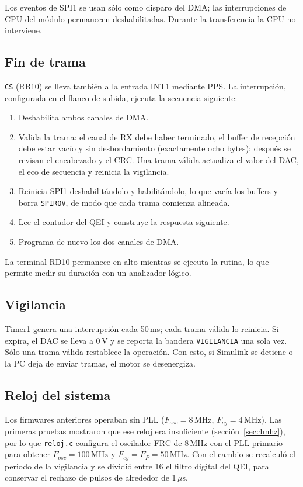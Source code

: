 \documentclass[11pt]{article}
\newcommand{\code}[1]{\texttt{#1}}
\newcommand{\us}{\,$\mu$s}
\begin{document}
Los eventos de SPI1 se usan sólo como disparo del DMA; las interrupciones de
CPU del módulo permanecen deshabilitadas. Durante la transferencia la CPU no
interviene.

\subsection{Fin de trama}

\code{CS} (RB10) se lleva también a la entrada INT1 mediante PPS. La
interrupción, configurada en el flanco de subida, ejecuta la secuencia
siguiente:

\begin{enumerate}
\item Deshabilita ambos canales de DMA.
\item Valida la trama: el canal de RX debe haber terminado, el buffer de
  recepción debe estar vacío y sin desbordamiento (exactamente ocho bytes);
  después se revisan el encabezado y el CRC. Una trama válida actualiza el
  valor del DAC, el eco de secuencia y reinicia la vigilancia.
\item Reinicia SPI1 deshabilitándolo y habilitándolo, lo que vacía los
  buffers y borra \code{SPIROV}, de modo que cada trama comienza alineada.
\item Lee el contador del QEI y construye la respuesta siguiente.
\item Programa de nuevo los dos canales de DMA.
\end{enumerate}

La terminal RD10 permanece en alto mientras se ejecuta la rutina, lo que
permite medir su duración con un analizador lógico.

\subsection{Vigilancia}

Timer1 genera una interrupción cada 50\,ms; cada trama válida lo reinicia.
Si expira, el DAC se lleva a 0\,V y se reporta la bandera \code{VIGILANCIA}
una sola vez. Sólo una trama válida restablece la operación. Con esto, si
Simulink se detiene o la PC deja de enviar tramas, el motor se desenergiza.

\subsection{Reloj del sistema}

Los firmwares anteriores operaban sin PLL ($F_{osc} = 8$\,MHz,
$F_{cy} = 4$\,MHz). Las primeras pruebas mostraron que ese reloj era
insuficiente (sección~\ref{sec:4mhz}), por lo que \code{reloj.c} configura el
oscilador FRC de 8\,MHz con el PLL primario para obtener
$F_{osc} = 100$\,MHz y $F_{cy} = F_P = 50$\,MHz. Con el cambio se recalculó
el periodo de la vigilancia y se dividió entre 16 el filtro digital del QEI,
para conservar el rechazo de pulsos de alrededor de 1\us.
\end{document}
